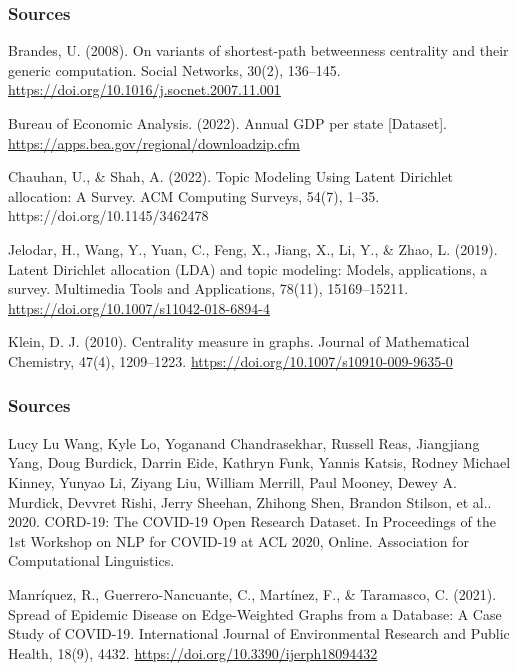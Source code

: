 \documentclass{beamer}
\begin{document}
\begin{frame}
\frametitle{Sources}

Brandes, U. (2008). On variants of shortest-path betweenness centrality and their generic computation. Social Networks, 30(2), 136–145. \url{https://doi.org/10.1016/j.socnet.2007.11.001} \\

\vspace{5px}

Bureau of Economic Analysis. (2022). Annual GDP per state [Dataset]. \url{https://apps.bea.gov/regional/downloadzip.cfm}

\vspace{5px}

Chauhan, U., \& Shah, A. (2022). Topic Modeling Using Latent Dirichlet allocation: A Survey. ACM Computing Surveys, 54(7), 1–35. https://doi.org/10.1145/3462478

\vspace{5px}

Jelodar, H., Wang, Y., Yuan, C., Feng, X., Jiang, X., Li, Y., \& Zhao, L. (2019). Latent Dirichlet allocation (LDA) and topic modeling: Models, applications, a survey. Multimedia Tools and Applications, 78(11), 15169–15211. \url{https://doi.org/10.1007/s11042-018-6894-4}

\vspace{5px}

Klein, D. J. (2010). Centrality measure in graphs. Journal of Mathematical Chemistry, 47(4), 1209–1223. \url{https://doi.org/10.1007/s10910-009-9635-0}
 
\end{frame}


\begin{frame}
\frametitle{Sources}

Lucy Lu Wang, Kyle Lo, Yoganand Chandrasekhar, Russell Reas, Jiangjiang Yang, Doug Burdick, Darrin Eide, Kathryn Funk, Yannis Katsis, Rodney Michael Kinney, Yunyao Li, Ziyang Liu, William Merrill, Paul Mooney, Dewey A. Murdick, Devvret Rishi, Jerry Sheehan, Zhihong Shen, Brandon Stilson, et al.. 2020. CORD-19: The COVID-19 Open Research Dataset. In Proceedings of the 1st Workshop on NLP for COVID-19 at ACL 2020, Online. Association for Computational Linguistics.

\vspace{5px}

Manríquez, R., Guerrero-Nancuante, C., Martínez, F., \& Taramasco, C. (2021). Spread of Epidemic Disease on Edge-Weighted Graphs from a Database: A Case Study of COVID-19. International Journal of Environmental Research and Public Health, 18(9), 4432. \url{https://doi.org/10.3390/ijerph18094432}

\vspace{5px}

\end{frame}
\end{document}
